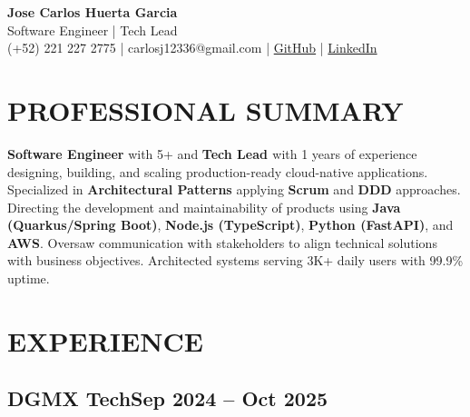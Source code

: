 \documentclass[a4paper,10pt]{article}
\newcommand{\kw}[1]{\textbf{\textcolor{keyword}{#1}}}
\begin{document}
\begin{center}
{\bfseries\LARGE Jose Carlos Huerta Garcia} \\
Software Engineer | Tech Lead \\
(+52) 221 227 2775 | carlosj12336@gmail.com | \href{https://github.com/jcarloshg}{GitHub} | \href{https://www.linkedin.com/in/jose-carlos-huerta-garcia-773952212}{LinkedIn}
\end{center}

\section*{PROFESSIONAL SUMMARY}
\kw{Software Engineer} with 5+ and \kw{Tech Lead } with 1 years of experience designing, building, and scaling production-ready cloud-native applications. Specialized in \kw{Architectural Patterns} applying \kw{Scrum} and \kw{DDD} approaches. Directing the development and maintainability of products using \kw{Java (Quarkus/Spring Boot)}, \kw{Node.js (TypeScript)}, \kw{Python (FastAPI)}, and \kw{AWS}. Oversaw communication with stakeholders to align technical solutions with business objectives. Architected systems serving 3K+ daily users with 99.9\% uptime.

\section*{EXPERIENCE}

\subsection*{\small DGMX Tech\hfill\textbf{Sep 2024 -- Oct 2025}}
\end{document}
